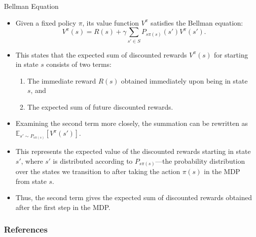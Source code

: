 \documentclass[handout]{beamer}
\begin{document}
\begin{frame}{Bellman Equation}
\scriptsize
\begin{itemize}
    \item Given a fixed policy \( \pi \), its value function \( V^{\pi} \) satisfies the Bellman equation:
    \[
    V^{\pi}(s) = R(s) + \gamma \sum_{s' \in S} P_{s\pi(s)}(s') V^{\pi}(s').
    \]
    \item This states that the expected sum of discounted rewards \( V^{\pi}(s) \) for starting in state \( s \) consists of two terms:
    \begin{enumerate}
        \item The immediate reward \( R(s) \) obtained immediately upon being in state \( s \), and
        \item The expected sum of future discounted rewards.
    \end{enumerate}
    \item Examining the second term more closely, the summation can be rewritten as \( \mathbb{E}_{s' \sim P_{s\pi(s)}}[V^{\pi}(s')] \).
    \item This represents the expected value of the discounted rewards starting in state \( s' \), where \( s' \) is distributed according to \( P_{s\pi(s)} \)—the probability distribution over the states we transition to after taking the action \( \pi(s) \) in the MDP from state \( s \).
    \item Thus, the second term gives the expected sum of discounted rewards obtained after the first step in the MDP.
\end{itemize}
\end{frame}





\begin{frame}[allowframebreaks]\scriptsize
\frametitle{References}


%
\end{frame}  









\end{document}
